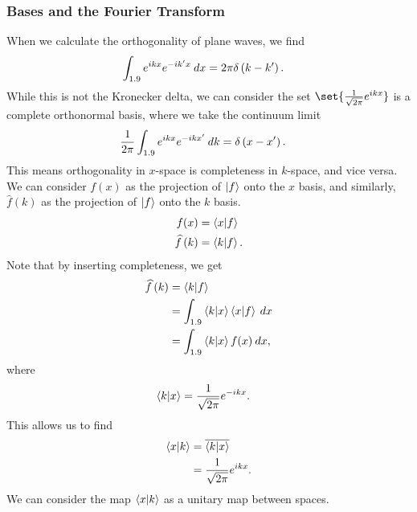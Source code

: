 \documentclass[10pt]{mypackage}
\begin{document}
\subsubsection{Bases and the Fourier Transform}%
When we calculate the orthogonality of plane waves, we find
\begin{align*}
  \int_{1.9}^{} e^{ikx}e^{-ik'x}\:dx &= 2\pi \delta\left(k-k'\right).
\end{align*}
While this is not the Kronecker delta, we can consider the set $\set{\frac{1}{\sqrt{2\pi}}e^{ikx}}$ is a complete orthonormal basis, where we take the continuum limit
\begin{align*}
  \frac{1}{2\pi}\int_{1.9}^{} e^{ikx}e^{-ikx'}\:dk &= \delta\left(x-x'\right).
\end{align*}
This means orthogonality in $x$-space is completeness in $k$-space, and vice versa. We can consider $f(x)$ as the projection of $\ket{f}$ onto the $x$ basis, and similarly, $\widehat{f}\left(k\right)$ as the projection of $\ket{f}$ onto the $k$ basis.
\begin{align*}
  f(x) &= \braket{x}{f}\\
  \widehat{f}\left(k\right) &= \braket{k}{f}.
\end{align*}
Note that by inserting completeness, we get
\begin{align*}
  \widehat{f}\left(k\right) &= \braket{k}{f}\\
                            &= \int_{1.9}^{} \braket{k}{x}\braket{x}{f}\:dx\\
                            &= \int_{1.9}^{} \braket{k}{x}f(x)\:dx,
\end{align*}
where
\begin{align*}
  \braket{k}{x} &= \frac{1}{\sqrt{2\pi}}e^{-ikx}.
\end{align*}
This allows us to find
\begin{align*}
  \braket{x}{k} &= \overline{\braket{k}{x}}\\
                &= \frac{1}{\sqrt{2\pi}}e^{ikx}.
\end{align*}
We can consider the map $\braket{x}{k}$ as a unitary map between spaces.
\end{document}
